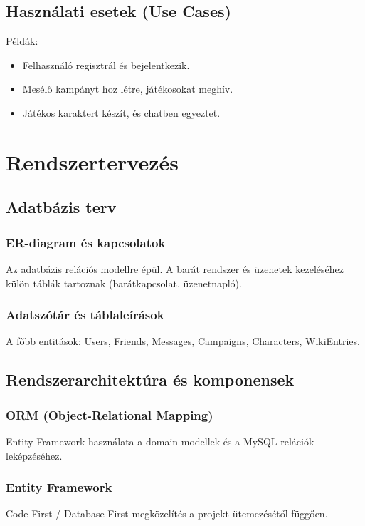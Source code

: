\documentclass[colorlinks]{thesis-kando}
\theoremstyle{definition}
\theoremstyle{remark}
\begin{document}
	\section{Használati esetek (Use Cases)}
	Példák:
	\begin{itemize}
		\item Felhasználó regisztrál és bejelentkezik.
		\item Mesélő kampányt hoz létre, játékosokat meghív.
		\item Játékos karaktert készít, és chatben egyeztet.
	\end{itemize}
	
	\chapter{Rendszertervezés}
	
	\section{Adatbázis terv}
	\subsection{ER-diagram és kapcsolatok}
	Az adatbázis relációs modellre épül. A barát rendszer és üzenetek kezeléséhez külön táblák tartoznak (barátkapcsolat, üzenetnapló).
	
	\subsection{Adatszótár és táblaleírások}
	A főbb entitások: Users, Friends, Messages, Campaigns, Characters, WikiEntries.
	
	\section{Rendszerarchitektúra és komponensek}
	\subsection{ORM (Object-Relational Mapping)}
	Entity Framework használata a domain modellek és a MySQL relációk leképzéséhez.
	
	\subsection{Entity Framework}
	Code First / Database First megközelítés a projekt ütemezésétől függően.
	
\end{document}
